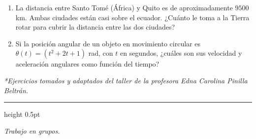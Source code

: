 \documentclass[11pt, letterpaper]{article}
\begin{document}
\begin{enumerate}[label=\arabic*., leftmargin=*, itemsep=8pt]
		\item La distancia entre Santo Tomé (África) y Quito es de aproximadamente $9500$ km. Ambas ciudades están casi sobre el ecuador. ¿Cuánto le toma a la Tierra rotar para cubrir la distancia entre las dos ciudades?
		
		\item Si la posición angular de un objeto en movimiento circular es $\theta(t) = \left(t^{2} + 2t + 1\right)$ rad, con $t$ en segundos, ¿cuáles son sus velocidad y aceleración angulares como función del tiempo?
		
	\end{enumerate}
	
	\vfill
	\noindent
	\begin{center}
		\small\textit{*Ejercicios tomados y adaptados del taller de la profesora Edna Carolina Pinilla Beltrán.}
	\end{center}
	
	\vspace{0.5cm}
	{\color{UnalGreen}\hrule height 0.5pt}
	\begin{center}
		\small
		\textit{Trabajo en grupos.}
	\end{center}
	
\end{document}
